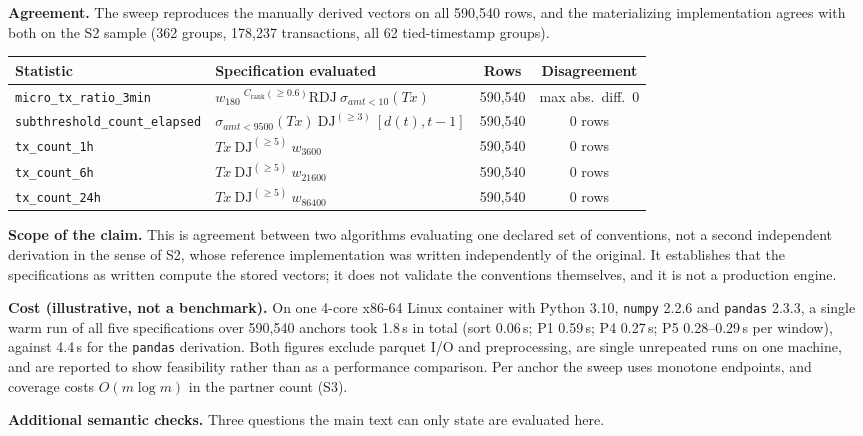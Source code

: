 \documentclass[10pt]{article}
\newcommand{\tf}[1]{\texttt{#1}}
\newcommand{\rel}[1]{\mathit{#1}}
\newcommand{\op}[1]{\mathrm{#1}}
\newcommand{\rc}[1]{^{(#1)}}
\begin{document}
\textbf{Agreement.} The sweep reproduces the manually derived vectors on all 590{,}540 rows, and the materializing implementation agrees with both on the S2 sample (362 groups, 178{,}237 transactions, all 62 tied-timestamp groups).

\begin{center}\footnotesize
\begin{tabular}{@{}llcc@{}}
\toprule
Statistic & Specification evaluated & Rows & Disagreement \\
\midrule
\tf{micro\_tx\_ratio\_3min}        & $w_{180}\ {}^{C_{\mathrm{rank}}(\geq 0.6)}\!\op{RDJ}\ \sigma_{\rel{amt}<10}(\rel{Tx})$ & 590,540 & max abs.\ diff.\ 0 \\
\tf{subthreshold\_count\_elapsed}  & $\sigma_{\rel{amt}<9500}(\rel{Tx})\ \op{DJ}\rc{\geq 3}\ [d(t),t{-}1]$ & 590,540 & 0 rows \\
\tf{tx\_count\_1h}                 & $\rel{Tx}\ \op{DJ}\rc{\geq 5}\ w_{3600}$  & 590,540 & 0 rows \\
\tf{tx\_count\_6h}                 & $\rel{Tx}\ \op{DJ}\rc{\geq 5}\ w_{21600}$ & 590,540 & 0 rows \\
\tf{tx\_count\_24h}                & $\rel{Tx}\ \op{DJ}\rc{\geq 5}\ w_{86400}$ & 590,540 & 0 rows \\
\bottomrule
\end{tabular}\end{center}

\textbf{Scope of the claim.} This is agreement between two algorithms evaluating one declared set of conventions, not a second independent derivation in the sense of S2, whose reference implementation was written independently of the original. It establishes that the specifications as written compute the stored vectors; it does not validate the conventions themselves, and it is not a production engine.

\textbf{Cost (illustrative, not a benchmark).} On one 4-core x86-64 Linux container with Python 3.10, \tf{numpy} 2.2.6 and \tf{pandas} 2.3.3, a single warm run of all five specifications over 590,540 anchors took 1.8\,s in total (sort 0.06\,s; P1 0.59\,s; P4 0.27\,s; P5 0.28--0.29\,s per window), against 4.4\,s for the \tf{pandas} derivation. Both figures exclude parquet I/O and preprocessing, are single unrepeated runs on one machine, and are reported to show feasibility rather than as a performance comparison. Per anchor the sweep uses monotone endpoints, and coverage costs $O(m\log m)$ in the partner count (S3).

\textbf{Additional semantic checks.} Three questions the main text can only state are evaluated here.
\end{document}

